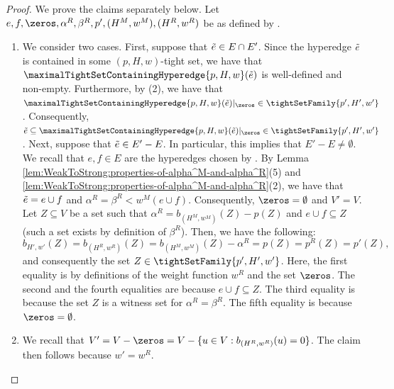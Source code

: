 \begin{proof} We prove the claims separately below. Let $e, f, \zeros, \alpha^R, \beta^R, p', (H^M, w^M), (H^R, w^R)$ be as defined by .
\begin{enumerate}
    \item We consider two cases. First, suppose that $\Tilde{e} \in E \cap E'$. Since the hyperedge $\Tilde{e}$ is contained in some $(p, H, w)$-tight set, we have that $\maximalTightSetContainingHyperedge{p, H, w}(\Tilde{e})$ is well-defined and non-empty. Furthermore, by (2), we have that $\maximalTightSetContainingHyperedge{p, H, w}(\Tilde{e})|_{\zeros} \in \tightSetFamily{p', H', w'}$. Consequently, $\Tilde{e} \subseteq \maximalTightSetContainingHyperedge{p, H, w}(\Tilde{e})|_{\zeros} \in \tightSetFamily{p', H', w'}$. Next, suppose that $\Tilde{e} \in E' - E$. In particular, this implies that $E' - E \not= \emptyset$. 
    We recall that $e, f \in E$ are the hyperedges chosen by    . 
    By Lemma \ref{lem:WeakToStrong:properties-of-alpha^M-and-alpha^R}(5) and \ref{lem:WeakToStrong:properties-of-alpha^M-and-alpha^R}(2), we have that $\Tilde{e} = e\cup f$ and $\alpha^R = \beta^R < w^M(e \cup f)$. Consequently, $\zeros = \emptyset$ and $V' = V$. Let $Z \subseteq V$ be a set such that 
    $\alpha^R = b_{(H^M, w^M)}(Z) - p(Z)$ and $e\cup f \subseteq Z$ (such a set exists by definition of $\beta^R$).
    Then, we have the following: 
    $$b_{H',w'}(Z) = b_{(H^R, w^R)}(Z) = b_{(H^M, w^M)}(Z) - \alpha^R = p(Z) = p^R(Z) = p'(Z),$$
    and consequently the set $Z \in \tightSetFamily{p', H', w'}$.
    Here, the first equality is by definitions of the weight function $w^R$ and the set $\zeros$. The second and the fourth equalities are because $e \cup f \subseteq Z$. The third equality is because the set $Z$ is a witness set for $\alpha^R = \beta^R$. 
    The fifth equality is because $\zeros = \emptyset$.  %

    \item We recall that $V' = V - \zeros = V - \{u\in V : b_{(H^R, w^R)}(u) = 0\}$. The claim then follows because $w' = w^R$. 
    
\end{enumerate}
\end{proof}

